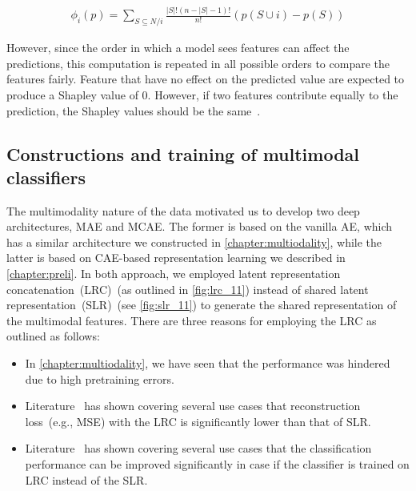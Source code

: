 \vspace{-2mm}
\begin{align}
    \phi_{i}(p)=\sum_{S \subseteq N / i} \frac{|S| !(n-|S|-1) !}{n !}(p(S \cup i)-p(S))
    \label{eq:shap}
\end{align}

\hspace*{3.5mm} However, since the order in which a model sees features can affect the predictions, this computation is repeated in all possible orders to compare the features fairly. Feature that have no effect on the predicted value are expected to produce a Shapley value of 0. However, if two features contribute equally to the prediction, the Shapley values should be the same~\cite{NIPS2017_7062}. 


\subsection{Constructions and training of multimodal classifiers}
The multimodality nature of the data motivated us to develop two deep architectures, MAE and MCAE. The former is based on the vanilla AE, which has a similar architecture we constructed in \cref{chapter:multiodality}, while the latter is based on CAE-based representation learning we described in \cref{chapter:preli}. In both approach, we employed latent representation concatenation~(LRC)~(as outlined in \cref{fig:lrc_11}) instead of shared latent representation~(SLR)~(see \cref{fig:slr_11}) to generate the shared representation of the multimodal features. There are three reasons for employing the LRC as outlined as follows: 

\vspace{-2mm}
\begin{itemize}[noitemsep]
    \item In \cref{chapter:multiodality}, we have seen that the performance was hindered due to high pretraining errors. 
    \item Literature~\cite{mmdcae} has shown covering several use cases that reconstruction loss~(e.g., MSE) with the LRC is significantly lower than that of SLR. 
    \item Literature~\cite{mmdcae} has shown covering several use cases that the classification performance can be improved significantly in case if the classifier is trained on LRC instead of the SLR. 
\end{itemize}
\vspace{-2mm}

